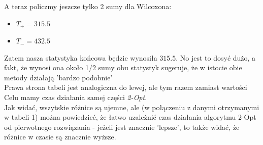 \documentclass{article}
\begin{document}
A teraz policzmy jeszcze tylko 2 sumy dla Wilcoxona:
\begin{itemize}
	\item $T_+ = 315.5$
	\item $T_- = 432.5$
\end{itemize}
Zatem nasza statystyka końcowa będzie wynosiła $315.5$. No jest to dosyć dużo, a fakt, że wynosi ona około 1/2 sumy obu statystyk sugeruje, że w istocie obie metody działają 'bardzo podobnie'\\

Prawa strona tabeli jest analogiczna do lewej, ale tym razem zamiast wartości Celu mamy czas działania samej części \textit{2-Opt}.\\
Jak widać, wszytskie różnice są ujemne, ale (w połączeniu z danymi otrzymanymi w tabeli 1) można powiedzieć, że łatwo uzależnić czas działania algorytmu 2-Opt od pierwotnego rozwiązania - jeżeli jest znacznie 'lepsze', to także widać, że różnice w czasie są znacznie wyższe.\\

\newpage
\end{document}
